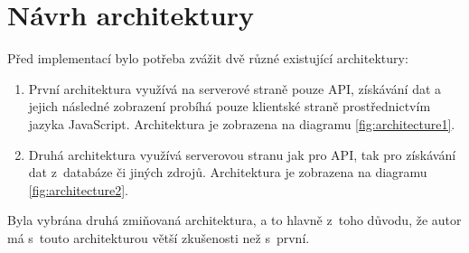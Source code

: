 \section{Návrh architektury}
Před implementací bylo potřeba zvážit dvě různé existující architektury:

\begin{enumerate}
    \item První architektura využívá na serverové straně pouze API, získávání dat a jejich následné zobrazení probíhá pouze klientské straně prostřednictvím jazyka JavaScript. Architektura je zobrazena na diagramu \ref{fig:architecture1}.
    \item Druhá architektura využívá serverovou stranu jak pro API, tak pro získávání dat z~databáze či jiných zdrojů. Architektura je zobrazena na diagramu \ref{fig:architecture2}.
\end{enumerate}

Byla vybrána druhá zmiňovaná architektura, a to hlavně z~toho důvodu, že autor má s~touto architekturou větší zkušenosti než s~první.


